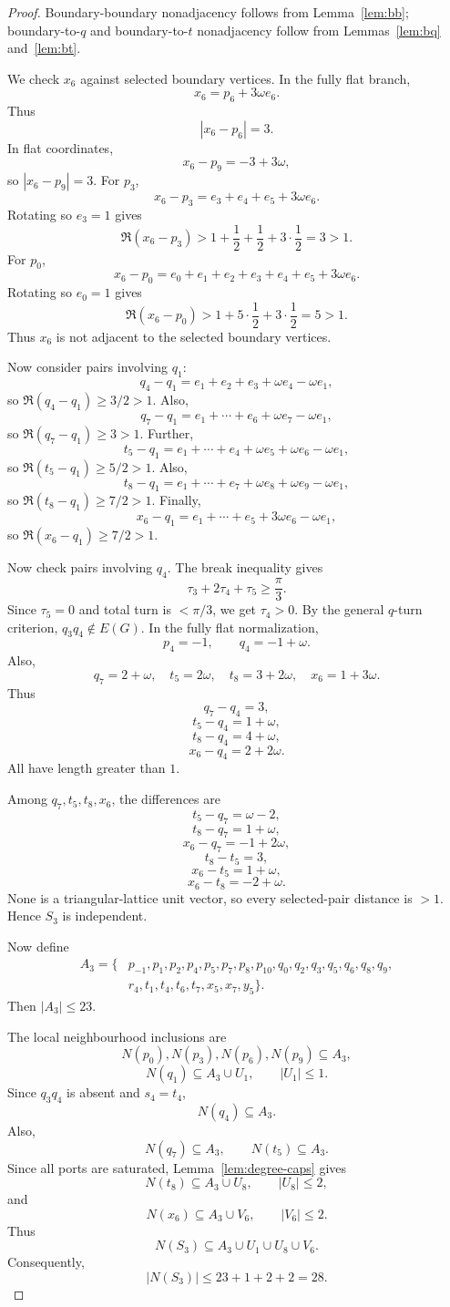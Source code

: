 \documentclass[11pt]{article}
\begin{document}
\begin{proof}
Boundary-boundary nonadjacency follows from Lemma~\ref{lem:bb}; boundary-to-$q$ and boundary-to-$t$ nonadjacency follow from Lemmas~\ref{lem:bq} and~\ref{lem:bt}.

We check $x_6$ against selected boundary vertices. In the fully flat branch,
\[
 x_6=p_6+3\omega e_6.
\]
Thus
\[
 |x_6-p_6|=3.
\]
In flat coordinates,
\[
 x_6-p_9=-3+3\omega,
\]
so $|x_6-p_9|=3$. For $p_3$,
\[
 x_6-p_3=e_3+e_4+e_5+3\omega e_6.
\]
Rotating so $e_3=1$ gives
\[
 \Re(x_6-p_3)>1+\frac12+\frac12+3\cdot\frac12=3>1.
\]
For $p_0$,
\[
 x_6-p_0=e_0+e_1+e_2+e_3+e_4+e_5+3\omega e_6.
\]
Rotating so $e_0=1$ gives
\[
 \Re(x_6-p_0)>1+5\cdot\frac12+3\cdot\frac12=5>1.
\]
Thus $x_6$ is not adjacent to the selected boundary vertices.

Now consider pairs involving $q_1$:
\[
 q_4-q_1=e_1+e_2+e_3+\omega e_4-\omega e_1,
\]
so $\Re(q_4-q_1)\ge3/2>1$.
Also,
\[
 q_7-q_1=e_1+\cdots+e_6+\omega e_7-\omega e_1,
\]
so $\Re(q_7-q_1)\ge3>1$.
Further,
\[
 t_5-q_1=e_1+\cdots+e_4+\omega e_5+\omega e_6-\omega e_1,
\]
so $\Re(t_5-q_1)\ge5/2>1$.
Also,
\[
 t_8-q_1=e_1+\cdots+e_7+\omega e_8+\omega e_9-\omega e_1,
\]
so $\Re(t_8-q_1)\ge7/2>1$.
Finally,
\[
 x_6-q_1=e_1+\cdots+e_5+3\omega e_6-\omega e_1,
\]
so $\Re(x_6-q_1)\ge7/2>1$.

Now check pairs involving $q_4$. The break inequality gives
\[
 \tau_3+2\tau_4+\tau_5\ge\frac{\pi}{3}.
\]
Since $\tau_5=0$ and total turn is $<\pi/3$, we get $\tau_4>0$. By the general $q$-turn criterion, $q_3q_4\notin E(G)$.
In the fully flat normalization,
\[
 p_4=-1,
 \qquad q_4=-1+\omega.
\]
Also,
\[
 q_7=2+\omega,
 \quad t_5=2\omega,
 \quad t_8=3+2\omega,
 \quad x_6=1+3\omega.
\]
Thus
\[
 q_7-q_4=3,
\]
\[
 t_5-q_4=1+\omega,
\]
\[
 t_8-q_4=4+\omega,
\]
\[
 x_6-q_4=2+2\omega.
\]
All have length greater than $1$.

Among $q_7,t_5,t_8,x_6$, the differences are
\[
 t_5-q_7=\omega-2,
\]
\[
 t_8-q_7=1+\omega,
\]
\[
 x_6-q_7=-1+2\omega,
\]
\[
 t_8-t_5=3,
\]
\[
 x_6-t_5=1+\omega,
\]
\[
 x_6-t_8=-2+\omega.
\]
None is a triangular-lattice unit vector, so every selected-pair distance is $>1$. Hence $S_3$ is independent.

Now define
\[
\begin{aligned}
A_3=\{&p_{-1},p_1,p_2,p_4,p_5,p_7,p_8,p_{10},q_0,q_2,q_3,q_5,q_6,q_8,q_9,\\
&r_4,t_1,t_4,t_6,t_7,x_5,x_7,y_5\}.
\end{aligned}
\]
Then $|A_3|\le23$.

The local neighbourhood inclusions are
\[
 N(p_0),N(p_3),N(p_6),N(p_9)\subseteq A_3,
\]
\[
 N(q_1)\subseteq A_3\cup U_1,
 \qquad |U_1|\le1.
\]
Since $q_3q_4$ is absent and $s_4=t_4$,
\[
 N(q_4)\subseteq A_3.
\]
Also,
\[
 N(q_7)\subseteq A_3,
 \qquad N(t_5)\subseteq A_3.
\]
Since all ports are saturated, Lemma~\ref{lem:degree-caps} gives
\[
 N(t_8)\subseteq A_3\cup U_8,
 \qquad |U_8|\le2,
\]
and
\[
 N(x_6)\subseteq A_3\cup V_6,
 \qquad |V_6|\le2.
\]
Thus
\[
 N(S_3)\subseteq A_3\cup U_1\cup U_8\cup V_6.
\]
Consequently,
\[
 |N(S_3)|\le23+1+2+2=28.
\]
\end{proof}
\end{document}
